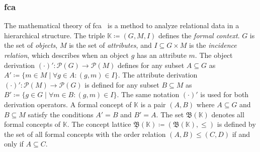 \subsubsection{\ac{fca}} The mathematical theory of \ac{fca}~\cite{fca-book} is a method to analyze relational data in a hierarchical structure.
The triple $\mathbb{K} \coloneq (G, M, I)$ defines the \emph{formal context}.
$G$ is the set of \emph{objects}, $M$ is the set of \emph{attributes},
and $I \subseteq G \times M$ is the \emph{incidence relation}, which describes when an object $g$ has an attribute $m$.
The object derivation $(\cdot)' : \mathcal{P}(G) \to \mathcal{P}(M)$
defines for any subset $A \subseteq G $ as $A' \coloneq \{m \in M \mid \forall g \in A : (g, m) \in I\}$.
The attribute derivation $(\cdot)' : \mathcal{P}(M) \to \mathcal{P}(G)$ is
defined for any subset $B \subseteq M $ as $B' \coloneq \{g \in G \mid \forall m \in B : (g, m) \in I\}$.
The same notation $(\cdot)'$ is used for both derivation operators.
A formal concept of $\mathbb{K}$ is a pair $(A, B)$ where $A \subseteq G$ and $B \subseteq M$
satisfy the conditions $A' = B$ and $B' = A$.
The set $\mathfrak{B}(\mathbb{K})$ denotes all formal concepts of $\mathbb{K}$.
The concept lattice $\underline{\mathfrak{B}}(\mathbb{K}) \coloneq (\mathfrak{B}(\mathbb{K}), \leq)$ is defined by the set of all formal concepts with the order relation
$(A, B) \leq (C, D)$ if and only if $A \subseteq C$.

